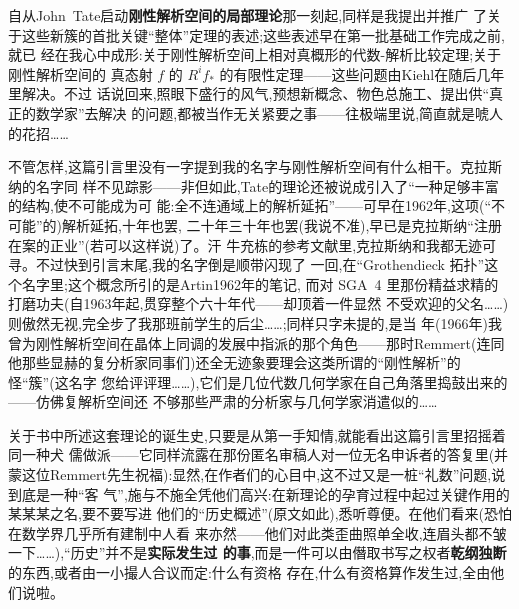 自从John~Tate启动\textbf{刚性解析空间的局部理论}那一刻起,同样是我提出并推广
了关于这些新簇的首批关键“整体”定理的表述;这些表述早在第一批基础工作完成之前,就已
经在我心中成形:关于刚性解析空间上相对真概形的代数-解析比较定理;关于刚性解析空间的
真态射 $f$ 的 $R^i f_*$ 的有限性定理——这些问题由Kiehl在随后几年里解决。不过
话说回来,照眼下盛行的风气,\dmark{}预想新概念、物色总施工、提出供“真正的数学家”去解决
的问题,都被当作无关紧要之事——往极端里说,简直就是唬人的花招……

不管怎样,这篇引言里没有一字提到我的名字与刚性解析空间有什么相干。克拉斯纳的名字同
样不见踪影——非但如此,Tate的理论还被说成引入了“一种足够丰富的结构,使不可能成为可
能:全不连通域上的解析延拓”——可早在1962年,这项(“不可能”的)解析延拓,十年也罢,
二十年三十年也罢(我说不准),早已是克拉斯纳“注册在案的正业”(若可以这样说)了。汗
牛充栋的参考文献里,克拉斯纳和我都无迹可寻。不过快到引言末尾,我的名字倒是顺带闪现了
一回,在“Grothendieck 拓扑”这个名字里;这个概念所引的是Artin1962年的笔记,
而对 SGA~4 里那份精益求精的打磨功夫(自1963年起,贯穿整个六十年代——却顶着一件显然
不受欢迎的父名……)则傲然无视,完全步了我那班前学生的后尘……;同样只字未提的,是当
年(1966年)我曾为刚性解析空间在晶体上同调的发展中指派的那个角色——那时Remmert(连同
他那些显赫的复分析家同事们)还全无迹象要理会这类所谓的“刚性解析”的怪“簇”(这名字
您给评评理……),它们是几位代数几何学家在自己角落里捣鼓出来的——仿佛复解析空间还
不够那些严肃的分析家与几何学家消遣似的……

\pmark{}关于书中所述这套理论的诞生史,只要是从第一手知情,就能看出这篇引言里招摇着同一种犬
儒做派——它同样流露在那份匿名审稿人对一位无名申诉者的答复里(并蒙这位Remmert先生祝福):显然,在作者们的心目中,这不过又是一桩“礼数”问题,说到底是一种“客
气”,施与不施全凭他们高兴:在新理论的孕育过程中起过关键作用的某某某之名,要不要写进
他们的“历史概述”(原文如此),悉听尊便。在他们看来(恐怕在数学界几乎所有建制中人看
来亦然——他们对此类歪曲照单全收,连眉头都不皱一下……),“历史”并不是\textbf{实际发生过
的事},而是一件可以由僭取书写之权者\textbf{乾纲独断}的东西,或者由一小撮人合议而定:什么有资格
存在,什么有资格算作发生过,全由他们说啦。

